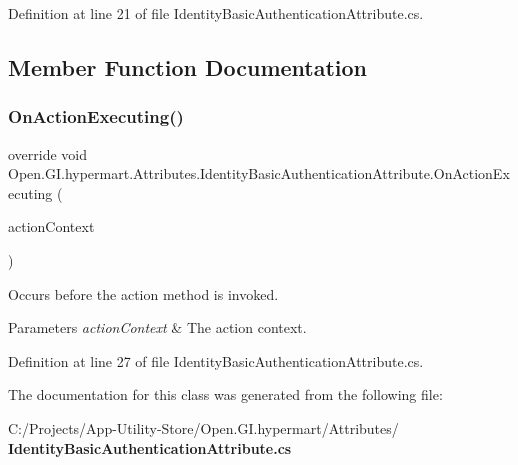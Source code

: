 Definition at line 21 of file Identity\+Basic\+Authentication\+Attribute.\+cs.



\subsection{Member Function Documentation}
\mbox{\label{class_open_1_1_g_i_1_1hypermart_1_1_attributes_1_1_identity_basic_authentication_attribute_af9c5fb2bfb2694f6c284d6f1ec81fc38}} 
\subsubsection{On\+Action\+Executing()}
{\footnotesize\ttfamily override void Open.\+G\+I.\+hypermart.\+Attributes.\+Identity\+Basic\+Authentication\+Attribute.\+On\+Action\+Executing (\begin{DoxyParamCaption}\item[{Http\+Action\+Context}]{action\+Context }\end{DoxyParamCaption})}



Occurs before the action method is invoked. 


\begin{DoxyParams}{Parameters}
{\em action\+Context} & The action context.\\
\hline
\end{DoxyParams}


Definition at line 27 of file Identity\+Basic\+Authentication\+Attribute.\+cs.



The documentation for this class was generated from the following file\+:\begin{DoxyCompactItemize}
\item 
C\+:/\+Projects/\+App-\/\+Utility-\/\+Store/\+Open.\+G\+I.\+hypermart/\+Attributes/\textbf{ Identity\+Basic\+Authentication\+Attribute.\+cs}\end{DoxyCompactItemize}
